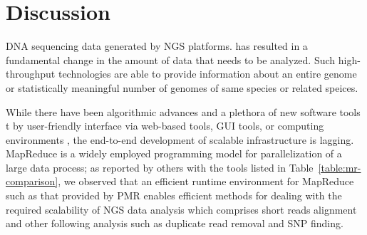 \documentclass{acm_proc_article-sp}
\begin{document}
\section{Discussion}\label{sec:discussions}


DNA sequencing data generated by NGS
platforms\cite{metzker2010,1000genome,wang2009-natrevgen,alex2009,mcpherson2009}.
has resulted in a fundamental change in the amount of data that needs
to be analyzed. Such high-throughput technologies are able to provide
information about an entire genome or statistically meaningful number
of genomes of same species or related speices.


While there have been algorithmic advances and a plethora of new
software tools t by user-friendly interface via web-based tools, GUI
tools, or computing environments \cite{galaxy}, the end-to-end
development of scalable infrastructure is lagging.  MapReduce is a
widely employed programming model for parallelization of a large data
process; as reported by others with the tools listed in
Table~\ref{table:mr-comparison}, we observed that an efficient 
runtime environment for MapReduce such as that provided by PMR 
enables efficient methods for dealing with the required
scalability of NGS data analysis which comprises short reads alignment
and other following analysis such as duplicate read removal and SNP
finding.

\end{document}
